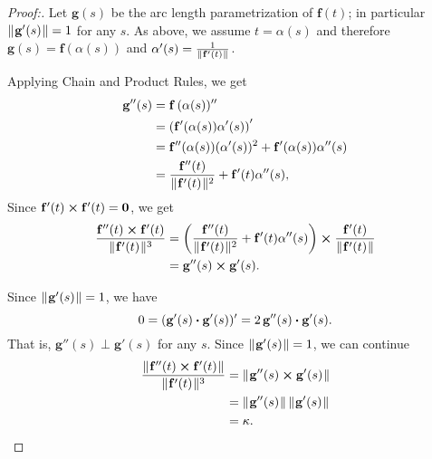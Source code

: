 \begin{proofbar}
\begin{proof}[Proof:]
Let $\mathbf{g}(s)$ be the arc length parametrization of $\mathbf{f}(t)$; in particular $\lVert\mspace{1mu}\mathbf{g}'(s)\mspace{1mu}\rVert=1$ for any $s$.
As above, we assume $t=\alpha(s)$ and therefore  $\mathbf{g}(s)=\mathbf{f}(\alpha(s))$ and $\alpha'(s)=\frac{1}{\lVert\mspace{1mu}\mathbf{f}'(t)\mspace{1mu}\rVert}$.

Applying Chain and Product Rules, we get
\begin{align*}
\mathbf{g}''(s)&=\mathbf{f}\,(\alpha(s))''
\\
&=\left(\mathbf{f}'(\alpha(s))\alpha'(s)\right)'
\\
&=\mathbf{f}''(\alpha(s))(\alpha'(s))^2+\mathbf{f}'(\alpha(s))\alpha''(s)
\\
&=\frac{\mathbf{f}''(t)}{\lVert\mspace{1mu}\mathbf{f}'(t)\mspace{1mu}\rVert^2}+\mathbf{f}'(t)\alpha''(s),
\end{align*}
Since $\mathbf{f}'(t) \bm{\times} \mathbf{f}'(t)=\mathbf{0}$,
we get
\begin{align*}
\frac{\mathbf{f}''(t) \bm{\times} \mathbf{f}'(t)}{\lVert\mspace{1mu}\mathbf{f}'(t)\mspace{1mu}\rVert^3}
&=
\left(\frac{\mathbf{f}''(t)}{\lVert\mspace{1mu}\mathbf{f}'(t)\mspace{1mu}\rVert^2}+\mathbf{f}'(t)\alpha''(s)\right) \bm{\times} \frac{\mathbf{f}'(t)}{\lVert\mspace{1mu}\mathbf{f}'(t)\mspace{1mu}\rVert}
\\
&=
\mathbf{g}''(s) \bm{\times} \mathbf{g}'(s).
\end{align*}

Since $\lVert\mspace{1mu}\mathbf{g}'(s)\mspace{1mu}\rVert=1$, we have
\[0=(\mathbf{g}'(s) \bm{\cdot} \mathbf{g}'(s))'=2\,\mathbf{g}''(s) \bm{\cdot} \mathbf{g}'(s).\]
That is, $\mathbf{g}''(s)\perp\mathbf{g}'(s)$ for any $s$.  Since $\lVert\mspace{1mu}\mathbf{g}'(s)\mspace{1mu}\rVert=1$, we can continue
\begin{align*}
\frac{\lVert\mspace{1mu}\mathbf{f}''(t) \bm{\times} \mathbf{f}'(t)\mspace{1mu}\rVert}{\lVert\mspace{1mu}\mathbf{f}'(t)\mspace{1mu}\rVert^3}
&=
\lVert\mspace{1mu}\mathbf{g}''(s) \bm{\times} \mathbf{g}'(s)\mspace{1mu}\rVert
\\
&=\lVert\mspace{1mu}\mathbf{g}''(s)\mspace{1mu}\rVert\,\lVert\mspace{1mu}\mathbf{g}'(s)\mspace{1mu}\rVert
\\
&=\kappa.
\end{align*}
\end{proof}\end{proofbar}

